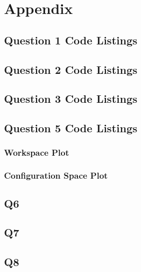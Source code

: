\newpage
\renewcommand{\thesubsection}{\thesection.\arabic{subsection}}
\section{Appendix}
	\subsection{Question 1 Code Listings}
	
	
	\pagebreak
	\subsection{Question 2 Code Listings}
	
	
	\pagebreak
	\subsection{Question 3 Code Listings}
	
	
	\pagebreak
	\subsection{Question 5 Code Listings}
		\subsubsection{Workspace Plot}
		
		\subsubsection{Configuration Space Plot}
		
		
		
	
	\pagebreak
	\subsection{Q6}
	
	\pagebreak
	\subsection{Q7}
	
	\pagebreak
	\subsection{Q8}
	